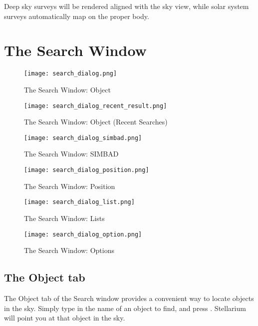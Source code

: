 Deep sky surveys will be rendered aligned with the sky view, while solar system
surveys automatically map on the proper body.


\section{The Search Window}
\label{sec:gui:search}

\begin{figure}[p]
\centering\texttt{[image: search\_dialog.png]}
\caption{The Search Window: Object}
\label{fig:gui:search}
\end{figure}

\begin{figure}[p]
\centering\texttt{[image: search\_dialog\_recent\_result.png]}
\caption{The Search Window: Object (Recent Searches)}
\label{fig:gui:search:recentSearches}
\end{figure}

\begin{figure}[p]
\centering\texttt{[image: search\_dialog\_simbad.png]}
\caption{The Search Window: SIMBAD}
\label{fig:gui:search:simbad}
\end{figure}

\begin{figure}[p]
\centering\texttt{[image: search\_dialog\_position.png]}
\caption{The Search Window: Position}
\label{fig:gui:search:position}
\end{figure}

\begin{figure}[tbp]
\centering\texttt{[image: search\_dialog\_list.png]}
\caption{The Search Window: Lists}
\label{fig:gui:search:lists}
\end{figure}


\begin{figure}[tbp]
\centering\texttt{[image: search\_dialog\_option.png]}
\caption{The Search Window: Options}
\label{fig:gui:search:options}
\end{figure}

\subsection{The Object tab}
\label{sec:gui:SearchWindow:Object}
The Object tab of the Search window provides a convenient way to locate objects
in the sky. Simply type in the name of an object to find, and press
\key{\return}. Stellarium will point you at that object in the sky.

